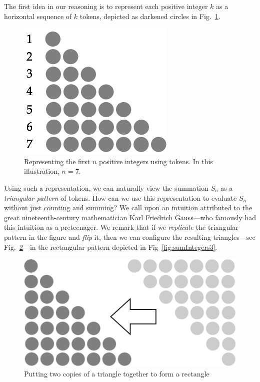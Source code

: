The first idea in our reasoning is to represent each positive integer $k$ as a horizontal sequence of $k$ tokens, depicted as darkened circles in Fig.~\ref{fig:sumIntegers1}.
\begin{figure}[ht]
\begin{center}
       \includegraphics[scale=0.35]{FiguresMaths/SumIntegersBasis}
\caption{Representing the first $n$ positive integers using tokens.  In this illustration, $n=7$.}
       \label{fig:sumIntegers1}
\end{center}
\end{figure}
Using such a representation, we can naturally view the summation $S_n$ as a \textit{triangular pattern} of tokens.  How can we use this representation to evaluate $S_n$ without just counting and summing?  We call upon an intuition attributed to the great nineteenth-century mathematician Karl Friedrich Gauss---who famously had this intuition as a preteenager.  We remark that if we {\em replicate} the triangular pattern in the figure and {\em flip} it, then we can configure the resulting triangles---see Fig.~\ref{fig:sumIntegers2}---in the rectangular pattern depicted in Fig~\ref{fig:sumIntegers3}.
\begin{figure}[ht]
\begin{center}
       \includegraphics[scale=0.35]{FiguresMaths/SumIntegersIntermediate}
   \caption{Putting two copies of a triangle together to form a rectangle}
       \label{fig:sumIntegers2}
\end{center}
\end{figure}
